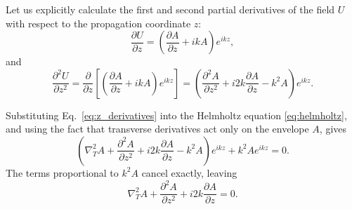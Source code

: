 \begin{resolucao}[Solution]
    Let us explicitly calculate the first and second partial derivatives of the field $U$ with respect to the propagation coordinate $z$:
    \begin{equation}
        \frac{\partial U}{\partial z}
        =
        \left(
            \frac{\partial A}{\partial z}
            +
            ikA
        \right)e^{ikz},
        \label{eq:first_z_derivative}
    \end{equation}
    and
    \begin{equation}
        \frac{\partial^2 U}{\partial z^2}
        =
        \frac{\partial}{\partial z}
        \left[
            \left(
                \frac{\partial A}{\partial z}
                +
                ikA
            \right)e^{ikz}
        \right]
        =
        \left(
            \frac{\partial^2 A}{\partial z^2}
            +
            i2k\frac{\partial A}{\partial z}
            -
            k^2A
        \right)e^{ikz}.
        \label{eq:z_derivatives}
    \end{equation}
    
    Substituting Eq.~\eqref{eq:z_derivatives} into the Helmholtz equation \eqref{eq:helmholtz}, and using the fact that transverse derivatives act only on the envelope $A$, gives
    \begin{equation}
        \left(
            \nabla_T^2 A
            +
            \frac{\partial^2 A}{\partial z^2}
            +
            i2k\frac{\partial A}{\partial z}
            -
            k^2A
        \right)e^{ikz}
        +
        k^2Ae^{ikz}
        =
        0.
    \end{equation}
    The terms proportional to $k^2A$ cancel exactly, leaving
    \begin{equation}
        \nabla_T^2 A
        +
        \frac{\partial^2 A}{\partial z^2}
        +
        i2k\frac{\partial A}{\partial z}
        =
        0.
        \label{eq:exact_envelope_equation_before_paraxial}
    \end{equation}
    

\end{resolucao}
